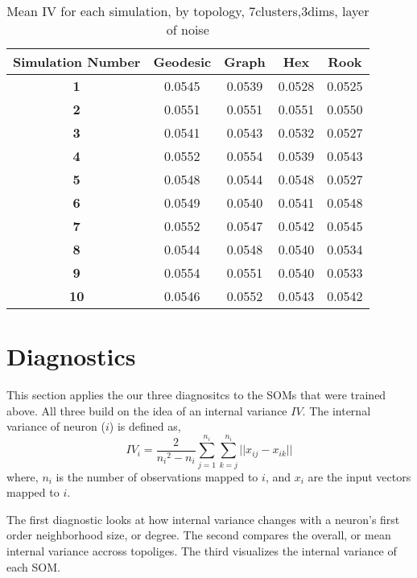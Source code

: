 \begin{table}[hbt]
\centering
\caption{Mean IV for each simulation, by topology, 7clusters,3dims, layer of
noise}
\label{ivtable3:n}
\begin{tabular}{|c||c|c|c|c|}
\hline
\textbf{Simulation Number} & Geodesic & Graph & Hex & Rook \\
\hline
\hline
\textbf{1} & 0.0545 & 0.0539 & 0.0528 & 0.0525 \\
\hline
\textbf{2} & 0.0551 & 0.0551 & 0.0551 & 0.0550 \\
\hline
\textbf{3} & 0.0541 & 0.0543 & 0.0532 & 0.0527 \\
\hline
\textbf{4} & 0.0552 & 0.0554 & 0.0539 & 0.0543 \\
\hline
\textbf{5} & 0.0548 & 0.0544 & 0.0548 & 0.0527 \\
\hline
\textbf{6} & 0.0549 & 0.0540 & 0.0541 & 0.0548 \\
\hline
\textbf{7} & 0.0552 & 0.0547 & 0.0542 & 0.0545 \\
\hline
\textbf{8} & 0.0544 & 0.0548 & 0.0540 & 0.0534 \\
\hline
\textbf{9} & 0.0554 & 0.0551 & 0.0540 & 0.0533 \\
\hline
\textbf{10} & 0.0546 & 0.0552 & 0.0543 & 0.0542 \\
\hline
\end{tabular} \end{table}



\section{Diagnostics}
This section applies the our three diagnositcs to the SOMs that were trained
above.  All three build on the idea of an internal variance \(IV\). The
internal variance of neuron (\(i\)) is defined as,
 \begin{equation}
   {IV_i} = \frac{2}{{n_i}^2-{n_i}}\sum_{j=1}^{n_i}\sum_{k=j}^{n_i} ||{x_{ij}}-{x_{ik}}||
 \label{eqno1}
 \end{equation}
where, \(n_i\) is the number of observations mapped to \(i\), and \(x_i\) are
the input vectors mapped to \(i\).

The first diagnostic looks at how internal variance changes with a neuron's first
order neighborhood size, or degree.  The second compares the overall, or mean
internal variance accross topoliges.  The third visualizes the internal
variance of each SOM.

